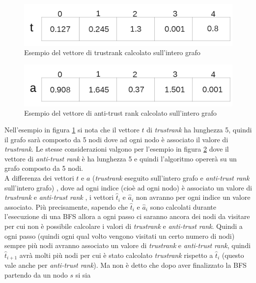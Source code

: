 \begin{figure}
\centering
 \includegraphics{immagini/test/trustVettore}
 \caption{Esempio del vettore di trustrank calcolato sull'intero grafo}
 \label{fig:tVettore}
\end{figure}
\begin{figure}
\centering
 \includegraphics{immagini/test/immagineAntiTrust}
 \caption{Esempio del vettore di anti-trust rank calcolato sull'intero grafo}
 \label{fig:aVettore}
\end{figure}
Nell'esempio in figura \ref{fig:tVettore} si nota che il vettore \(t\) di \textit{trustrank} ha lunghezza 5, quindi il grafo sarà composto da 5 nodi dove ad ogni nodo è associato il valore di \textit{trustrank}. Le stesse considerazioni valgono per l'esempio in figura \ref{fig:aVettore} dove il vettore di \textit{anti-trust rank} è ha lunghezza 5 e quindi l'algoritmo opererà su un grafo composto da 5 nodi.\\
A differenza dei vettori \(t\) e \(a\) (\textit{trustrank} eseguito sull'intero grafo e \textit{anti-trust rank} sull'intero grafo) , dove ad ogni indice (cioè ad ogni nodo) è associato un valore di \textit{trustrank} e \textit{anti-trust rank} , i vettori \(\hat{t}_i\) e \(\hat{a}_i\) non avranno per ogni indice un valore associato. Più precisamente, sapendo che \(\hat{t}_i\) e \(\hat{a}_i\) sono calcolati durante l'esecuzione di una BFS allora a ogni passo ci saranno ancora dei nodi da visitare per cui non è possibile calcolare i valori di \textit{trustrank} e \textit{anti-trust rank}. Quindi a ogni passo (quindi ogni qual volto vengono visitati un certo numero di nodi) sempre più nodi avranno associato un valore di \textit{trustrank} e \textit{anti-trust rank}, quindi \(\hat{t}_{i+1}\) avrà molti più nodi per cui è stato calcolato \textit{trustrank} rispetto a \(\hat{t}_i\) (questo vale anche per \textit{anti-trust rank}). Ma non è detto che dopo aver finalizzato la BFS partendo da un nodo \(s\) si sia 
